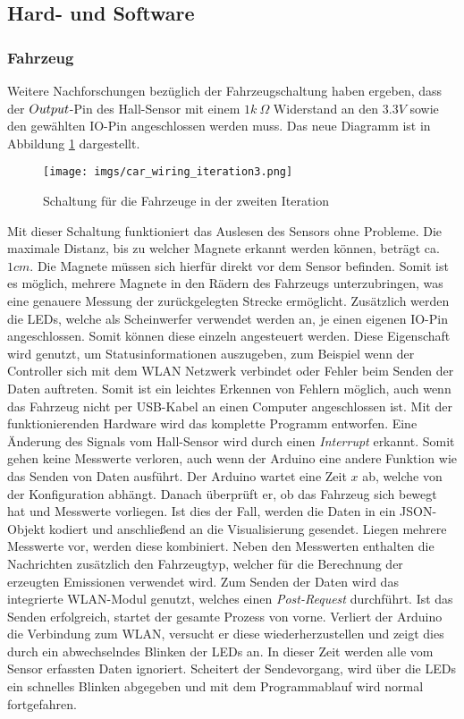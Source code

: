 \documentclass[.../Dokumentation.tex]{subfiles}
\begin{document}
    \subsection{Hard- und Software}\label{sec-ita2-hardware}
    \subsubsection*{Fahrzeug}
    Weitere Nachforschungen bezüglich der Fahrzeugschaltung haben ergeben, dass der $Out\-put$-Pin des Hall-Sensor mit einem $1k\ \Omega$  Widerstand an den $3.3V$ sowie den gewählten IO-Pin angeschlossen werden muss. Das neue Diagramm ist in Abbildung \ref{fig-hardware-car-iteration2} dargestellt.
       	\begin{figure}[H]
    	\begin{center}
    		\texttt{[image: imgs/car\_wiring\_iteration3.png]}
    		\caption{Schaltung für die Fahrzeuge in der zweiten Iteration }
    		\label{fig-hardware-car-iteration2}
    	\end{center}
    \end{figure}
    \noindent
    Mit dieser Schaltung funktioniert das Auslesen des Sensors ohne Probleme. Die maximale Distanz, bis zu welcher Magnete erkannt werden können, beträgt ca. $1 cm$. Die Magnete müssen sich hierfür direkt vor dem Sensor befinden. Somit ist es möglich, mehrere Magnete in den Rädern des Fahrzeugs unterzubringen, was eine genauere Messung der zurückgelegten Strecke ermöglicht. Zusätzlich werden die LEDs, welche als Scheinwerfer verwendet werden an, je einen eigenen IO-Pin angeschlossen. Somit können diese einzeln angesteuert werden. Diese Eigenschaft wird genutzt, um Statusinformationen auszugeben, zum Beispiel wenn der Controller sich mit dem WLAN Netzwerk verbindet oder Fehler beim Senden der Daten auftreten. Somit ist ein leichtes Erkennen von Fehlern möglich, auch wenn das Fahrzeug nicht per USB-Kabel an einen Computer angeschlossen ist. 
    Mit der funktionierenden Hardware wird das komplette Programm entworfen. Eine Änderung des Signals vom Hall-Sensor wird durch einen \emph{Interrupt} erkannt. Somit gehen keine Messwerte verloren, auch wenn der Arduino eine andere Funktion wie das Senden von Daten ausführt. Der Arduino wartet eine Zeit $x$ ab, welche von der Konfiguration abhängt. Danach überprüft er, ob das Fahrzeug sich bewegt hat und Messwerte vorliegen. Ist dies der Fall, werden die Daten in ein JSON-Objekt kodiert und anschließend an die Visualisierung gesendet. Liegen mehrere Messwerte vor, werden diese kombiniert. Neben den Messwerten enthalten die Nachrichten zusätzlich den Fahrzeugtyp, welcher für die Berechnung der erzeugten Emissionen verwendet wird. Zum Senden der Daten wird das integrierte WLAN-Modul genutzt, welches einen \emph{Post-Request} durchführt. 
   	Ist das Senden erfolgreich, startet der gesamte Prozess von vorne. Verliert der Arduino die Verbindung zum WLAN, versucht er diese wiederherzustellen und zeigt dies durch ein abwechselndes Blinken der LEDs an. In dieser Zeit werden alle vom Sensor erfassten Daten ignoriert. Scheitert der Sendevorgang, wird über die LEDs ein schnelles  Blinken abgegeben und mit dem Programmablauf wird normal fortgefahren. 
\end{document}
